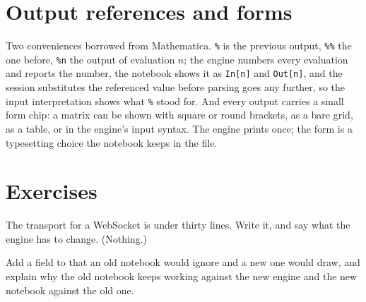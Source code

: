 \section{Output references and forms}

Two conveniences borrowed from Mathematica. \texttt{\%} is the previous output, \texttt{\%\%} the
one before, \texttt{\%n} the output of evaluation $n$; the engine numbers every evaluation and
reports the number, the notebook shows it as \texttt{In[n]} and \texttt{Out[n]}, and the session
substitutes the referenced value before parsing goes any further, so the input interpretation shows
what \texttt{\%} stood for. And every output carries a small form chip: a matrix can be shown with
square or round brackets, as a bare grid, as a table, or in the engine's input syntax. The engine
prints once; the form is a typesetting choice the notebook keeps in the file.

\section{Exercises}

\begin{exercisebox}
  The transport for a WebSocket is under thirty lines. Write it, and say what the engine has to
  change. (Nothing.)
\end{exercisebox}

\begin{exercisebox}
  Add a field to  that an old notebook would ignore and a new one would draw,
  and explain why the old notebook keeps working against the new engine and the new notebook
  against the old one.
\end{exercisebox}
